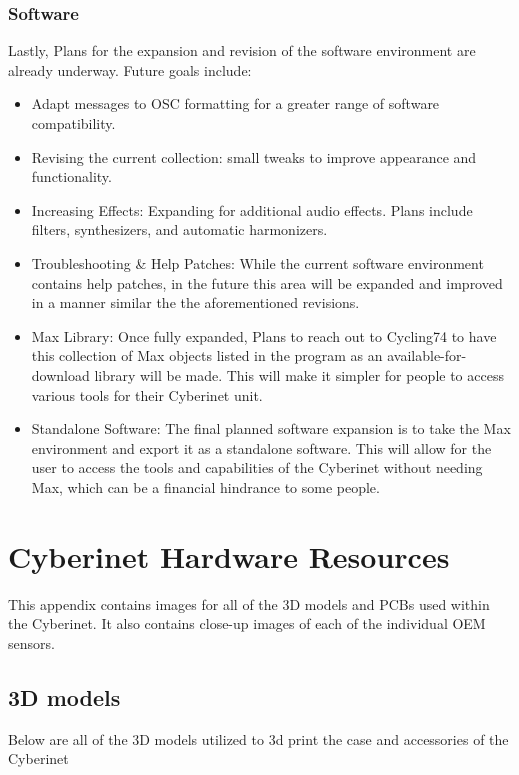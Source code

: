 \subsection{Software}
Lastly, Plans for the expansion and revision of the software environment are already underway. Future goals include:
\begin{itemize}
    \item Adapt messages to OSC formatting for a greater range of software compatibility.
    \item Revising the current collection: small tweaks to improve appearance and functionality.
    \item Increasing Effects: Expanding for additional audio effects. Plans include filters, synthesizers, and automatic harmonizers.
    \item Troubleshooting \& Help Patches: While the current software environment contains help patches, in the future this area will be expanded and improved in a manner similar the the aforementioned revisions.
    \item Max Library: Once fully expanded, Plans to reach out to Cycling74 to have this collection of Max objects listed in the program as an available-for-download library will be made. This will make it simpler for people to access various tools for their Cyberinet unit.
    \item Standalone Software: The final planned software expansion is to take the Max environment and export it as a standalone software. This will allow for the user to access the tools and capabilities of the Cyberinet without needing Max, which can be a financial hindrance to some people.
\end{itemize}



\appendix

\chapter{Cyberinet Hardware Resources}
This appendix contains images for all of the 3D models and PCBs used within the Cyberinet. It also contains close-up images of each of the individual OEM sensors.

\section{3D models}
Below are all of the 3D models utilized to 3d print the case and accessories of the Cyberinet


